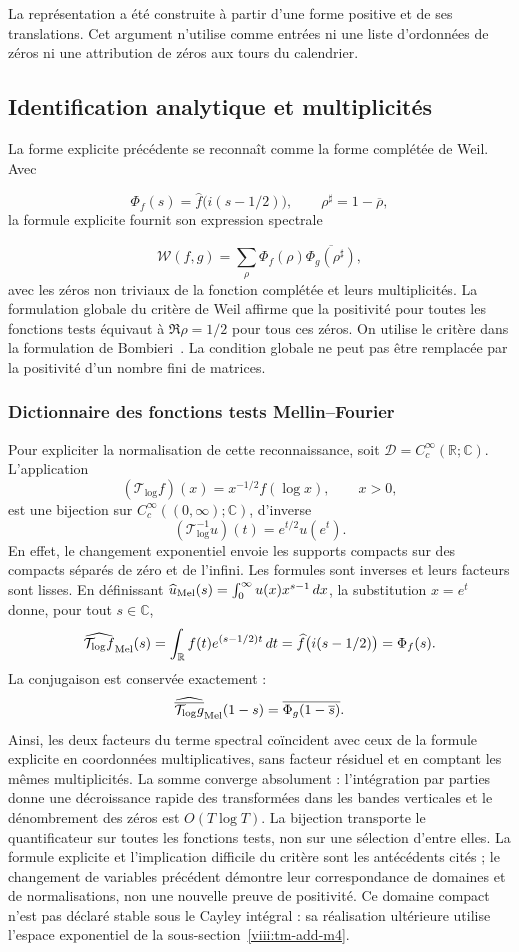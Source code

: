 La représentation a été construite à partir d'une forme positive et de ses translations. Cet argument n'utilise comme entrées ni une liste d'ordonnées de zéros ni une attribution de zéros aux tours du calendrier.

\subsection{Identification analytique et multiplicités}
\label{viii:rz:identificacion}
La forme explicite précédente se reconnaît comme la forme complétée de Weil. Avec

\[
\Phi_f(s)=\widehat f\bigl(i(s-1/2)\bigr),
\qquad \rho^\sharp=1-\overline\rho,
\]
la formule explicite fournit son expression spectrale

\[
\mathscr W(f,g)=\sum_\rho
\Phi_f(\rho)\overline{\Phi_g(\rho^\sharp)},
\]
avec les zéros non triviaux de la fonction complétée et leurs multiplicités. La formulation globale du critère de Weil affirme que la positivité pour toutes les fonctions tests équivaut à \(\Re\rho=1/2\) pour tous ces zéros. On utilise le critère dans la formulation de Bombieri~\cite{viii:bombieri2000}. La condition globale ne peut pas être remplacée par la positivité d'un nombre fini de matrices.

\subsubsection*{Dictionnaire des fonctions tests Mellin--Fourier}
\label{viii:rz:mellin-fourier}
Pour expliciter la normalisation de cette reconnaissance, soit
\(\mathcal D=C_c^\infty(\mathbb R;\mathbb C)\). L’application
\[
 (\mathcal T_{\log}f)(x)=x^{-1/2}f(\log x),\qquad x>0,
\]
est une bijection sur \(C_c^\infty((0,\infty);\mathbb C)\), d'inverse
\[
 (\mathcal T_{\log}^{-1}u)(t)=e^{t/2}u(e^t).
\]
En effet, le changement exponentiel envoie les supports compacts sur des compacts
séparés de zéro et de l'infini. Les formules sont inverses et leurs facteurs
sont lisses. En définissant
\(\widehat u_{\rm Mel}(s)=\int_0^\infty u(x)x^{s-1}\,dx\),
la substitution \(x=e^t\) donne, pour tout \(s\in\mathbb C\),
\[
 \widehat{\mathcal T_{\log}f}_{\rm Mel}(s)
 =\int_{\mathbb R}f(t)e^{(s-1/2)t}\,dt
 =\widehat f\bigl(i(s-1/2)\bigr)=\Phi_f(s).
\]
La conjugaison est conservée exactement :
\[
 \widehat{\overline{\mathcal T_{\log}g}}_{\rm Mel}(1-s)
 =\overline{\Phi_g(1-\overline s)}.
\]
Ainsi, les deux facteurs du terme spectral coïncident avec ceux de la
formule explicite en coordonnées multiplicatives, sans facteur résiduel
et en comptant les mêmes multiplicités. La somme converge absolument :
l’intégration par parties donne une décroissance rapide des transformées
dans les bandes verticales et le dénombrement des zéros est \(O(T\log T)\).
La bijection transporte le quantificateur sur toutes les fonctions tests, non sur une
sélection d’entre elles. La formule explicite et l’implication difficile du
critère sont les antécédents cités ; le changement de variables précédent
démontre leur correspondance de domaines et de normalisations, non une nouvelle
preuve de positivité. Ce domaine compact n’est pas déclaré stable sous
le Cayley intégral : sa réalisation ultérieure utilise l’espace exponentiel
de la sous-section~\ref{viii:tm-add-m4}.


